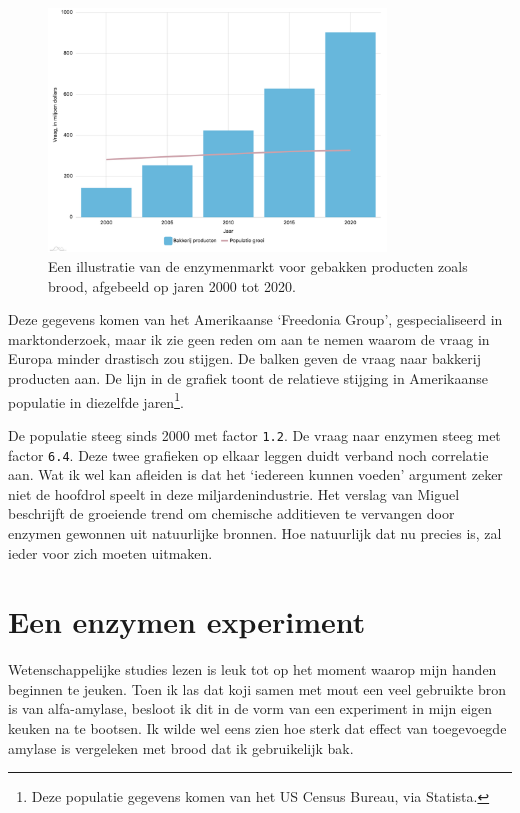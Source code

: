 \documentclass[
  11pt,
  dutch,
]{memoir}
\begin{document}
\begin{figure}
    \centering
    \includegraphics[width=0.8\textwidth,height=\textheight]{img/enzymenvraag.png}
    \caption[Een grafiek van de enzymenmarkt.]{Een illustratie van de enzymenmarkt voor gebakken producten zoals brood,
    afgebeeld op jaren 2000 tot 2020.}
\end{figure}

Deze gegevens komen van het Amerikaanse `Freedonia Group',
gespecialiseerd in marktonderzoek, maar ik zie geen reden om aan te
nemen waarom de vraag in Europa minder drastisch zou stijgen. De balken
geven de vraag naar bakkerij producten aan. De lijn in de grafiek toont
de relatieve stijging in Amerikaanse populatie in diezelfde
jaren\footnote{Deze populatie gegevens komen van het US Census Bureau,
  via Statista.}.

De populatie steeg sinds 2000 met factor \texttt{1.2}. De vraag naar
enzymen steeg met factor \texttt{6.4}. Deze twee grafieken op elkaar
leggen duidt verband noch correlatie aan. Wat ik wel kan afleiden is dat
het `iedereen kunnen voeden' argument zeker niet de hoofdrol speelt in
deze miljardenindustrie. Het verslag van Miguel beschrijft de groeiende
trend om chemische additieven te vervangen door enzymen gewonnen uit
natuurlijke bronnen. Hoe natuurlijk dat nu precies is, zal ieder voor
zich moeten uitmaken.

\hypertarget{een-enzymen-experiment}{%
\section{Een enzymen experiment}\label{een-enzymen-experiment}}

Wetenschappelijke studies lezen is leuk tot op het moment waarop mijn
handen beginnen te jeuken. Toen ik las dat koji samen met mout een veel
gebruikte bron is van alfa-amylase, besloot ik dit in de vorm van een
experiment in mijn eigen keuken na te bootsen. Ik wilde wel eens zien
hoe sterk dat effect van toegevoegde amylase is vergeleken met brood dat
ik gebruikelijk bak.
\end{document}
